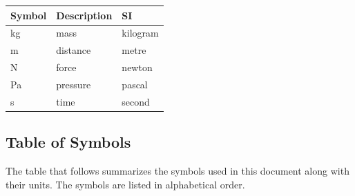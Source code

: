 \documentclass[12pt]{article}
\begin{document}
\renewcommand{\arraystretch}{1.2}
  \noindent \begin{tabular}{l l l} 
    \toprule		
    \textbf{Symbol} & \textbf{Description} & \textbf{SI}\\
    \midrule 
    \si{\kilogram} & mass & kilogram\\	
    \si{\meter} & distance & metre\\	
    \si{\newton} & force & newton\\	
    \si{\pascal} & pressure & pascal\\
    \si{\second} & time & second\\	
    \bottomrule
  \end{tabular}

\subsection{Table of Symbols}\label{TblSym}

The table that follows summarizes the symbols used in this document along with 
their units.  The symbols are listed in alphabetical order.
\newline

\renewcommand{\arraystretch}{1.2}
\end{document}
